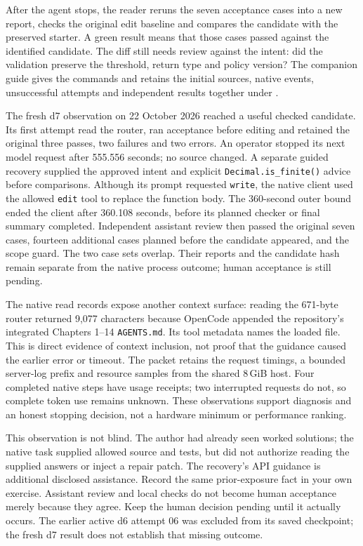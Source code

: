 After the agent stops, the reader reruns the seven acceptance cases into a new report, checks the original edit baseline and compares the candidate with the preserved starter. A green result means that those cases passed against the identified candidate. The diff still needs review against the intent: did the validation preserve the threshold, return type and policy version? The companion guide gives the commands and retains the initial sources, native events, unsuccessful attempts and independent results together under .

The fresh d7 observation on 22 October 2026 reached a useful checked candidate. Its first attempt read the router, ran acceptance before editing and retained the original three passes, two failures and two errors. An operator stopped its next model request after 555.556 seconds; no source changed. A separate guided recovery supplied the approved intent and explicit \texttt{Decimal.is\_finite()} advice before comparisons. Although its prompt requested \texttt{write}, the native client used the allowed \texttt{edit} tool to replace the function body. The 360-second outer bound ended the client after 360.108 seconds, before its planned checker or final summary completed. Independent assistant review then passed the original seven cases, fourteen additional cases planned before the candidate appeared, and the scope guard. The two case sets overlap. Their reports and the candidate hash remain separate from the native process outcome; human acceptance is still pending.

The native read records expose another context surface: reading the 671-byte router returned 9,077 characters because OpenCode appended the repository's integrated Chapters 1--14 \texttt{AGENTS.md}. Its tool metadata names the loaded file. This is direct evidence of context inclusion, not proof that the guidance caused the earlier error or timeout. The packet retains the request timings, a bounded server-log prefix and resource samples from the shared 8\,GiB host. Four completed native steps have usage receipts; two interrupted requests do not, so complete token use remains unknown. These observations support diagnosis and an honest stopping decision, not a hardware minimum or performance ranking.

This observation is not blind. The author had already seen worked solutions; the native task supplied allowed source and tests, but did not authorize reading the supplied answers or inject a repair patch. The recovery's API guidance is additional disclosed assistance. Record the same prior-exposure fact in your own exercise. Assistant review and local checks do not become human acceptance merely because they agree. Keep the human decision pending until it actually occurs. The earlier active d6 attempt 06 was excluded from its saved checkpoint; the fresh d7 result does not establish that missing outcome.

